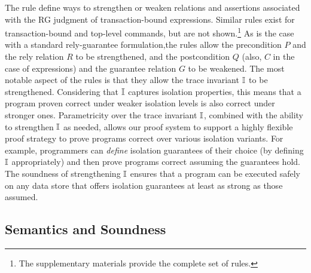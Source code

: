 
The  rule define ways to strengthen or
weaken relations and assertions associated with the RG judgment of
transaction-bound expressions. Similar rules exist for
transaction-bound and top-level commands, but are not
shown.\footnote{The supplementary materials provide the complete set
  of rules.} As is the case with a standard rely-guarantee
formulation,the rules allow the precondition $P$ and the rely relation
$R$ to be strengthened, and the postcondition $Q$ (also, $C$ in the
case of expressions) and the guarantee relation $G$ to be weakened.
The most notable aspect of the  rules is that
they allow the trace invariant $\mathbb{I}$ to be strengthened. Considering
that $\mathbb{I}$ captures isolation properties, this means that a program
proven correct under weaker isolation levels is also correct under
stronger ones.  Parametricity over the trace invariant $\mathbb{I}$, combined
with the ability to strengthen $\mathbb{I}$ as needed, allows our proof system
to support a highly flexible proof strategy to prove programs correct
over various isolation variants. For example, programmers can
\emph{define} isolation guarantees of their choice (by defining $\mathbb{I}$
appropriately) and then prove programs correct assuming the guarantees
hold.  The soundness of strengthening $\mathbb{I}$ ensures that a program can
be executed safely on any data store that offers isolation guarantees
at least as strong as those assumed.

\subsection{Semantics and Soundness}


